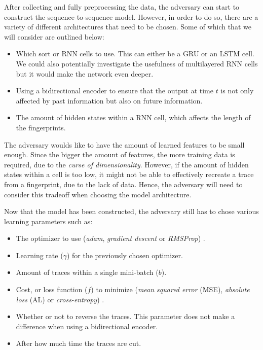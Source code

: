 After collecting and fully preprocessing the data, the adversary can start to construct the sequence-to-sequence model.
However, in order to do so, there are a variety of different architectures that need to be chosen.
Some of which that we will consider are outlined below:

\begin{itemize}
  \item Which sort or RNN cells to use. This can either be a GRU or an LSTM cell.
    We could also potentially investigate the usefulness of multilayered RNN cells but it would make the network even deeper.

  \item Using a bidirectional encoder to ensure that the output at time $t$ is not only affected by past information but also on future information.

  \item The amount of hidden states within a RNN cell, which affects the length of the fingerprints.
\end{itemize}

The adversary woulds like to have the amount of learned features to be small enough.
Since the bigger the amount of features, the more training data is required, due to the \textit{curse of dimensionality}.
However, if the amount of hidden states within a cell is too low, it might not be able to effectively recreate a trace from a fingerprint, due to the lack of data.
Hence, the adversary will need to consider this tradeoff when choosing the model architecture.

Now that the model has been constructed, the adversary still has to chose various learning parameters such as:

\newpage

\begin{itemize}
  \item The optimizer to use (\textit{adam}, \textit{gradient descent} or \textit{RMSProp}) \cite{tensorflow}.
  \item Learning rate ($\gamma$) for the previously chosen optimizer.
  \item Amount of traces within a single mini-batch ($b$).
  \item Cost, or loss function ($f$) to minimize (\textit{mean squared error} (MSE), \textit{absolute loss} (AL) or \textit{cross-entropy}) \cite{tensorflow}.
  \item Whether or not to reverse the traces. This parameter does not make a difference when using a bidirectional encoder.
  \item After how much time the traces are cut.
\end{itemize}

